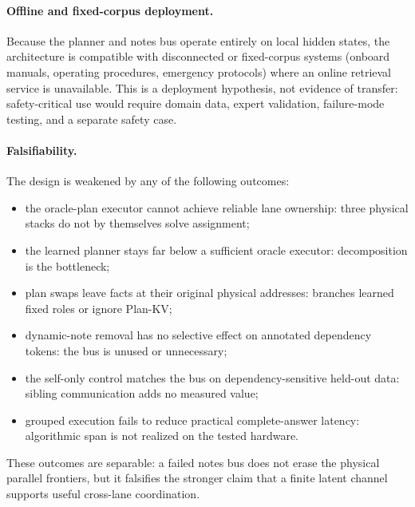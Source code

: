 \documentclass[10pt]{article}
\begin{document}
\paragraph{Offline and fixed-corpus deployment.}
Because the planner and notes bus operate entirely on local hidden states,
the architecture is compatible with disconnected or fixed-corpus systems
(onboard manuals, operating procedures, emergency protocols) where an online
retrieval service \citep{lewis2020rag} is unavailable. This is a deployment
hypothesis, not evidence of transfer: safety-critical use would require
domain data, expert validation, failure-mode testing, and a separate safety
case.

\paragraph{Falsifiability.}
The design is weakened by any of the following outcomes:
\begin{itemize}[leftmargin=*,itemsep=0.2em]
    \item the oracle-plan executor cannot achieve reliable lane ownership:
    three physical stacks do not by themselves solve assignment;
    \item the learned planner stays far below a sufficient oracle executor:
    decomposition is the bottleneck;
    \item plan swaps leave facts at their original physical addresses:
    branches learned fixed roles or ignore Plan-KV;
    \item dynamic-note removal has no selective effect on annotated
    dependency tokens: the bus is unused or unnecessary;
    \item the self-only control matches the bus on dependency-sensitive
    held-out data: sibling communication adds no measured value;
    \item grouped execution fails to reduce practical complete-answer
    latency: algorithmic span is not realized on the tested hardware.
\end{itemize}
These outcomes are separable: a failed notes bus does not erase the physical
parallel frontiers, but it falsifies the stronger claim that a finite latent
channel supports useful cross-lane coordination.
\end{document}
